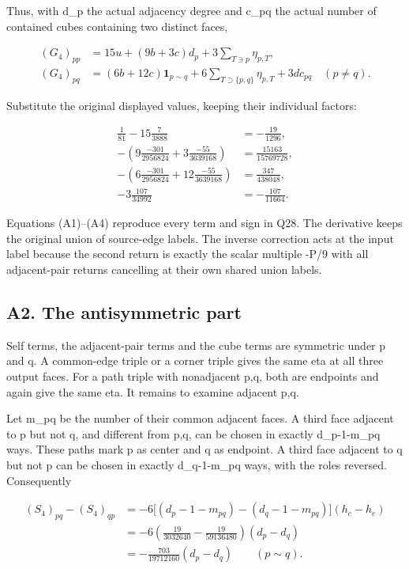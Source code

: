 \documentclass[11pt]{article}
\begin{document}
Thus, with d\_p the actual adjacency degree and c\_pq the actual number of contained cubes containing two distinct faces,

\[
\begin{aligned}
 (G_4)_{pp}&=15u+(9b+3c)d_p+3\sum_{T\ni p}\eta_{p,T},\\
 (G_4)_{pq}&=(6b+12c)\mathbf1_{p\sim q}
             +6\sum_{T\supset\{p,q\}}\eta_{p,T}+3d c_{pq}
             \quad(p\ne q).
\end{aligned}
\tag{A3}
\]

Substitute the original displayed values, keeping their individual factors:

\[
\begin{aligned}
\frac1{81}-15\frac7{3888}&=-\frac{19}{1296},\\
-\left(9\frac{-301}{2956824}+3\frac{-55}{3639168}\right)
 &=\frac{15163}{15769728},\\
-\left(6\frac{-301}{2956824}+12\frac{-55}{3639168}\right)
 &=\frac{347}{438048},\\
-3\frac{107}{34992}&=-\frac{107}{11664}.
\end{aligned} \tag{A4}
\]

Equations (A1)--(A4) reproduce every term and sign in Q28. The derivative keeps the original union of source-edge labels. The inverse correction acts at the input label because the second return is exactly the scalar multiple -P/9 with all adjacent-pair returns cancelling at their own shared union labels.

\subsection*{A2. The antisymmetric part}

Self terms, the adjacent-pair terms and the cube terms are symmetric under p and q. A common-edge triple or a corner triple gives the same eta at all three output faces. For a path triple with nonadjacent p,q, both are endpoints and again give the same eta. It remains to examine adjacent p,q.

Let m\_pq be the number of their common adjacent faces. A third face adjacent to p but not q, and different from p,q, can be chosen in exactly d\_p-1-m\_pq ways. These paths mark p as center and q as endpoint. A third face adjacent to q but not p can be chosen in exactly d\_q-1-m\_pq ways, with the roles reversed. Consequently

\[
\begin{aligned}
 (S_4)_{pq}-(S_4)_{qp}
 &=-6\bigl[(d_p-1-m_{pq})-(d_q-1-m_{pq})\bigr](h_c-h_e)\\
 &=-6\left(\frac{19}{3032640}-\frac{19}{59136480}\right)
       (d_p-d_q)\\
 &=-\frac{703}{19712160}(d_p-d_q)
 \qquad(p\sim q).
\end{aligned}
\tag{A5}
\]
\end{document}
